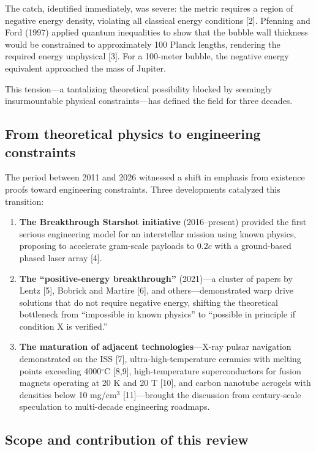 \documentclass[11pt,a4paper,onecolumn]{article}
\begin{document}
The catch, identified immediately, was severe: the metric requires a region of negative energy density, violating all classical energy conditions [2]. Pfenning and Ford (1997) applied quantum inequalities to show that the bubble wall thickness would be constrained to approximately 100 Planck lengths, rendering the required energy unphysical [3]. For a 100-meter bubble, the negative energy equivalent approached the mass of Jupiter.

This tension---a tantalizing theoretical possibility blocked by seemingly insurmountable physical constraints---has defined the field for three decades.

\subsection{From theoretical physics to engineering constraints}

The period between 2011 and 2026 witnessed a shift in emphasis from existence proofs toward engineering constraints. Three developments catalyzed this transition:

\begin{enumerate}
  \item \textbf{The Breakthrough Starshot initiative} (2016--present) provided the first serious engineering model for an interstellar mission using known physics, proposing to accelerate gram-scale payloads to $0.2c$ with a ground-based phased laser array [4].
  \item \textbf{The ``positive-energy breakthrough''} (2021)---a cluster of papers by Lentz [5], Bobrick and Martire [6], and others---demonstrated warp drive solutions that do not require negative energy, shifting the theoretical bottleneck from ``impossible in known physics'' to ``possible in principle if condition X is verified.''
  \item \textbf{The maturation of adjacent technologies}---X-ray pulsar navigation demonstrated on the ISS [7], ultra-high-temperature ceramics with melting points exceeding 4000$^\circ$C [8,9], high-temperature superconductors for fusion magnets operating at 20 K and 20 T [10], and carbon nanotube aerogels with densities below 10 mg/cm$^3$ [11]---brought the discussion from century-scale speculation to multi-decade engineering roadmaps.
\end{enumerate}

\subsection{Scope and contribution of this review}
\end{document}
